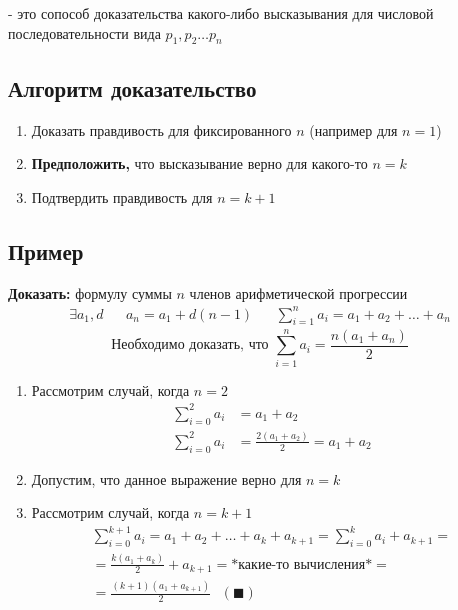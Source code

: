 \documentclass[class=article,a4paper,12pt,crop=false]{standalone}
\begin{document}
- это сопособ доказательства какого-либо высказывания 
для числовой последовательности вида $p_1, p_2 \dots p_n$

\subsection{Алгоритм доказательство} 

\begin{enumerate}
  \item {
    Доказать правдивость для фиксированного $n$ (например для $n = 1$)
  } \item {
    \textbf{Предположить,} что высказывание верно для какого-то $n = k$
  } \item {
    Подтвердить правдивость для $n = k + 1$
  }
\end{enumerate}

\subsection{Пример}

\textbf{Доказать:} формулу суммы $n$ членов арифметической прогрессии
\begin{align*}
  \exists a_1, d & & a_n = a_1 + d(n - 1) & & \sum\limits_{i = 1}^n{a_i} = a_1 + a_2 + \dots + a_n
\end{align*}
\begin{equation}
  \text{Необходимо доказать, что }\sum\limits_{i = 1}^n{a_i} = \frac{n (a_1 + a_n)}{2}
\end{equation}

\begin{enumerate}
  \item {
    Рассмотрим случай, когда $n = 2$
    \begin{equation}
      \begin{aligned}
        \sum\limits_{i = 0}^2{a_i} & = a_1 + a_2 \\
        \sum\limits_{i = 0}^2{a_i} & = \frac{2(a_1 + a_2)}{2} = a_1 + a_2
      \end{aligned}
    \end{equation}
  }
  \item {
    Допустим, что данное выражение верно для $n = k$
  }
  \item {
    Рассмотрим случай, когда $n = k + 1$
    \begin{multline}
      \sum\limits_{i = 0}^{k + 1}{a_i} = a_1 + a_2 + \dots + a_k +
      a_{k + 1} = \sum\limits_{i = 0}^k{a_i} + a_{k + 1} = \\
      = \frac{k(a_1 + a_k)}{2} + a_{k + 1} 
      = \text{*какие-то вычисления*} = \\
      = \frac{(k + 1)(a_1 + a_{k + 1})}{2} \:\:\: (\blacksquare)
    \end{multline}
  }
\end{enumerate}
\end{document}
